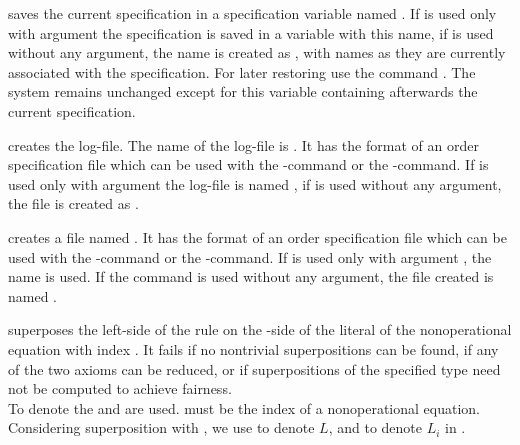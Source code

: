 \begin{command}
saves the current specification in a specification variable named
. If  is used only with
argument  the specification is saved in a variable with this name,
if  is used without any argument, the name is created as 
, with names as they are currently associated 
with the specification. For later restoring 
use the command . The system remains unchanged except for this variable 
containing afterwards the current specification.
\end{command}

\begin{command}
creates the log-file.
The name of the log-file is 
.
It has the format of an order specification file which can be used
with the -command or the -command. 
If  is used only with argument 
the log-file is named ,
if  is used without any argument, the file is
created as .
\end{command}

\begin{command}
creates a file named
.
It has the format of an order specification file which can be used
with the -command or the -command. 
If  is used only with argument ,
the name  is used.
If the command  is used without any argument, the file created
is named .
\end{command}

\begin{command}
superposes the left-side of the rule  on the 
-side of the
literal  of the nonoperational equation with index 
.
It fails if no nontrivial superpositions can be found, if
any of the two axioms can be reduced, or if
superpositions of the specified type need not be computed to achieve 
fairness.\\
To denote the   and  are used. 
 must be the index of a nonoperational equation.
Considering superposition with
, 
we use  to denote $L$, and 
to denote $L_i$ in .
\end{command}


